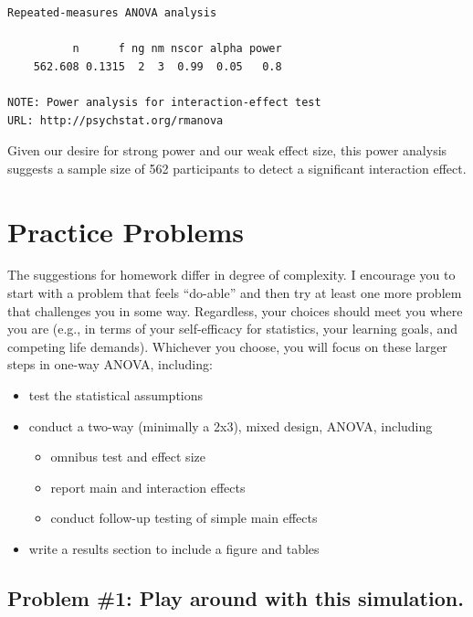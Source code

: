 \documentclass[
  11pt,
]{book}
\providecommand{\tightlist}{%
  \setlength{\itemsep}{0pt}\setlength{\parskip}{0pt}}
\begin{document}
\begin{verbatim}
Repeated-measures ANOVA analysis

          n      f ng nm nscor alpha power
    562.608 0.1315  2  3  0.99  0.05   0.8

NOTE: Power analysis for interaction-effect test
URL: http://psychstat.org/rmanova
\end{verbatim}

Given our desire for strong power and our weak effect size, this power analysis suggests a sample size of 562 participants to detect a significant interaction effect.

\hypertarget{practice-problems-8}{%
\section{Practice Problems}\label{practice-problems-8}}

The suggestions for homework differ in degree of complexity. I encourage you to start with a problem that feels ``do-able'' and then try at least one more problem that challenges you in some way. Regardless, your choices should meet you where you are (e.g., in terms of your self-efficacy for statistics, your learning goals, and competing life demands). Whichever you choose, you will focus on these larger steps in one-way ANOVA, including:

\begin{itemize}
\tightlist
\item
  test the statistical assumptions
\item
  conduct a two-way (minimally a 2x3), mixed design, ANOVA, including

  \begin{itemize}
  \tightlist
  \item
    omnibus test and effect size
  \item
    report main and interaction effects
  \item
    conduct follow-up testing of simple main effects
  \end{itemize}
\item
  write a results section to include a figure and tables
\end{itemize}

\hypertarget{problem-1-play-around-with-this-simulation.-2}{%
\subsection{Problem \#1: Play around with this simulation.}\label{problem-1-play-around-with-this-simulation.-2}}
\end{document}
